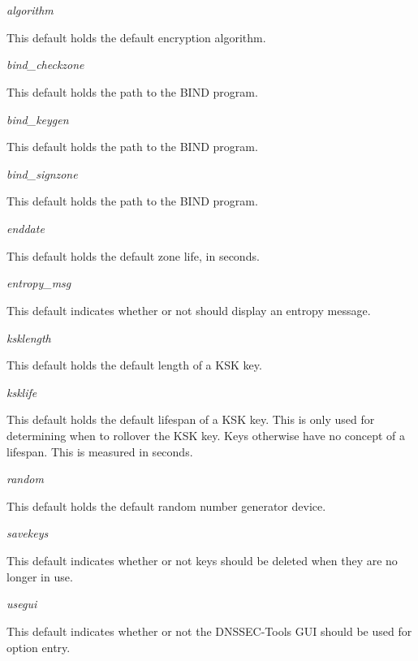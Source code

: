 \begin{description}

\item {\it algorithm}\verb" "

This default holds the default encryption algorithm.

\item {\it bind\_checkzone}\verb" "

This default holds the path to the  BIND program.

\item {\it bind\_keygen}\verb" "

This default holds the path to the  BIND program.

\item {\it bind\_signzone}\verb" "

This default holds the path to the  BIND program.

\item {\it enddate}\verb" "

This default holds the default zone life, in seconds.

\item {\it entropy\_msg}\verb" "

This default indicates whether or not  should display an
entropy message.

\item {\it ksklength}\verb" "

This default holds the default length of a KSK key.

\item {\it ksklife}\verb" "

This default holds the default lifespan of a KSK key.  This is only used
for determining when to rollover the KSK key.  Keys otherwise have no
concept of a lifespan.  This is measured in seconds.

\item {\it random}\verb" "

This default holds the default random number generator device.

\item {\it savekeys}\verb" "

This default indicates whether or not keys should be deleted when they are no
longer in use.

\item {\it usegui}\verb" "

This default indicates whether or not the DNSSEC-Tools GUI should be used for
option entry.


\end{description}
